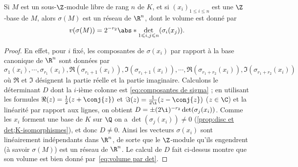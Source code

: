\documentclass[11pt, %
  title in boldface,
  theorem in new line,
  theorem numbering = section,
  number theorems separately,
  simple name,
]{beaulivre}
\begin{document}
    \begin{proposition}\label{prop:volume par det}
        Si \( M \) est un sous-\( \Z \)‑module libre de rang \( n \) de \( K \), et si \( (x_i)_{1 \leqslant i \leqslant n} \) est une \( \Z \)‑base de \( M \), alors \( \sigma(M) \) est un réseau de \( \R^n \), dont le volume est donné par
        \begin{equation}\label{eq:volume par det}
            v(\sigma(M)) = 2^{-r_2} \abs*{\det_{1 \leqslant i,j \leqslant n} (\sigma_i(x_j))}.
        \end{equation}
    \end{proposition}
    \begin{proof}
        En effet, pour \( i \) fixé, les composantes de \( \sigma(x_i) \) par rapport à la base canonique de \( \R^n \) sont données par
        \begin{equation}\label{eq:composantes de sigma}
            \sigma_1(x_i), \cdots, \sigma_{r_1}(x_i), \Re(\sigma_{r_1+1}(x_i)), \Im(\sigma_{r_1+1}(x_i)), \cdots, \Re(\sigma_{r_1+r_2}(x_i)), \Im(\sigma_{r_1+r_2}(x_i))
        \end{equation}
        où \( \Re \) et \( \Im \) désignent la partie réelle et la partie imaginaire. Calculons le déterminant \( D \) dont la \( i \)‑ième colonne est \eqref{eq:composantes de sigma} ; en utilisant les formules \( \Re(z) = \frac{1}{2}(z+\conj{z}) \) et \( \Im(z) = \frac{1}{2\i}(z-\conj{z}) \) (\( z \in \C \)) et la linéarité par rapport aux lignes, on obtient \( D = \pm (2\i)^{-r_2} \det(\sigma_j(x_i)) \). Comme les \( x_i \) forment une base de \( K \) sur \( \Q \) on a \( \det(\sigma_j(x_i)) \neq 0 \) (\cref{prop:disc et det;K-isomorphismes}), et donc \( D \neq 0 \). Ainsi les vecteurs \( \sigma(x_i) \) sont linéairement indépendants dans \( \R^n \), de sorte que le \( \Z \)‑module qu'ils engendrent (à savoir \( \sigma(M) \)) est un réseau de \( \R^n \). Le calcul de \( D \) fait ci-dessus montre que son volume est bien donné par~\eqref{eq:volume par det}.
    \end{proof}
\end{document}
